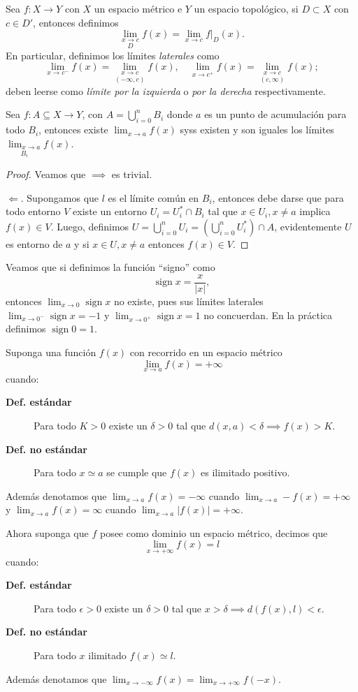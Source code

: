 \documentclass[11pt,oneside,a4paper]{book}
\DeclareMathOperator{\sign}{sign}
\begin{document}
\begin{mydef}[Límites en $D$]
Sea $f:X\rightarrow Y$ con $X$ un espacio métrico e $Y$ un espacio topológico, si $D\subset X$ con $c\in D'$, entonces definimos
$$\underset{D}{\lim_{x\to c}}f(x)=\lim_{x\to c}\left.f\right|_D(x).$$
En particular, definimos los límites \textit{laterales} como
$$\lim_{x\to c^-}f(x)=\underset{(-\infty,c)}{\lim_{x\to c}}f(x),\quad\lim_{x\to c^+}f(x)=\underset{(c,\infty)}{\lim_{x\to c}}f(x);$$
deben leerse como \textit{límite por la izquierda} o \textit{por la derecha} respectivamente.
\end{mydef}
\begin{thm}
Sea $f:A\subseteq X\rightarrow Y$, con $A=\bigcup_{i=0}^n B_i$ donde $a$ es un punto de acumulación para todo $B_i$, entonces existe $\displaystyle\lim_{x\to a}f(x)$ syss existen y son iguales los límites $\displaystyle\underset{B_i}{\lim_{x\to a}}f(x)$.
\end{thm}
\begin{proof}
Veamos que $\implies$ es trivial.

$\Longleftarrow$. Supongamos que $l$ es el límite común en $B_i$, entonces debe darse que para todo entorno $V$ existe un entorno $U_i=U^*_i\cap B_i$ tal que $x\in U_i,x\neq a$ implica $f(x)\in V$. Luego, definimos $U=\bigcup_{i=0}^n U_i=\left(\bigcup_{i=0}^n U^*_i\right)\cap A$, evidentemente $U$ es entorno de $a$ y si $x\in U,x\neq a$ entonces $f(x)\in V$.
\end{proof}
Veamos que si definimos la función ``signo'' como
$$\sign x=\frac{x}{|x|},$$
entonces $\lim_{x\to 0}\sign x$ no existe, pues sus límites laterales $\lim_{x\to 0^-}\sign x=-1$ y $\lim_{x\to0^+}\sign x=1$ no concuerdan. En la práctica definimos $\sign 0=1$.
\begin{mydef}
Suponga una función $f(x)$ con recorrido en un espacio métrico
$$\lim_{x\to a}f(x)=+\infty$$
cuando:
\begin{description}
\item[\bf Def. estándar] Para todo $K\gt 0$ existe un $\delta\gt 0$ tal que $d(x,a)\lt\delta\implies f(x)\gt K$.
\item[\bf Def. no estándar] Para todo $x\simeq a$ se cumple que $f(x)$ es ilimitado positivo.
\end{description}
Además denotamos que $\lim_{x\to a}f(x)=-\infty$ cuando $\lim_{x\to a}-f(x)=+\infty$ y $\lim_{x\to a}f(x)=\infty$ cuando $\lim_{x\to a}|f(x)|=+\infty$.

Ahora suponga que $f$ posee como dominio un espacio métrico, decimos que
$$\lim_{x\to+\infty}f(x)=l$$
cuando:
\begin{description}
\item[\bf Def. estándar] Para todo $\epsilon\gt 0$ existe un $\delta\gt 0$ tal que $x\gt\delta\implies d(f(x),l)\lt\epsilon$.
\item[\bf Def. no estándar] Para todo $x$ ilimitado $f(x)\simeq l$.
\end{description}
Además denotamos que $\lim_{x\to-\infty}f(x)=\lim_{x\to+\infty}f(-x)$.
\end{mydef}
\end{document}
